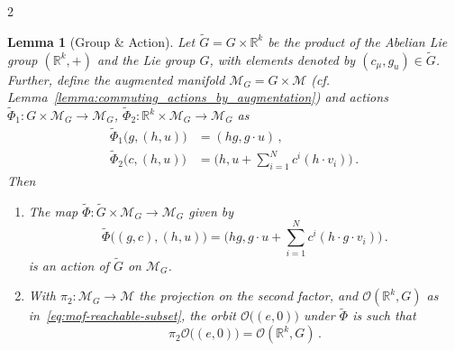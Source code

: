 \documentclass{article}
\newtheorem{lemma}[theorem]{Lemma}
\newcommand{\M}{\mathcal{M}}                                %
\newcommand{\R}{\mathbb{R}}                                 %
\begin{document}
\begin{multicols}{2}
\begin{lemma}[Group \& Action]\label{lemma:mof-group-and-action-MoRLie}
    Let $\widetilde{G} = G \times \R^k$ be the product of the Abelian Lie group $(\R^k,+)$ and the Lie group $G$, with elements denoted by $(c_\mu,g_u) \in \widetilde{G}$.
    Further, define the augmented manifold $\M_G = G\times\M$ (cf. Lemma~\ref{lemma:commuting_actions_by_augmentation}) and actions $\widetilde{\Phi}_1:G \times \M_G \rightarrow \M_G$, $\widetilde{\Phi}_2: \R^k \times \M_G \rightarrow \M_G$ as 
    \begin{align}
        \widetilde{\Phi}_1\big(g,(h,u)\big) &= (hg, g\cdot u) \,, \\
        \widetilde{\Phi}_2\big(c,(h,u)\big) &= \bigg(h, u + \sum_{i=1}^N c^i (h\cdot v_i)\bigg)\,.
    \end{align}  
    Then
    \begin{enumerate}
        \item The map $\widetilde{\Phi}: \widetilde{G} \times \M_G \rightarrow \M_G$ given by
                \begin{equation}\label{eq:mof-action-MORLie}
                    \widetilde{\Phi}\big( (g,c), (h,u)\big) = \bigg(hg, g\cdot u +\sum_{i=1}^N c^i (h\cdot g\cdot v_i)\bigg)\,.
                \end{equation}
                is an action of $\widetilde{G}$ on $\M_G$.
        \item With $\pi_2:\M_G\rightarrow\M$ the projection on the second factor, and $\mathcal{O}(\R^k,G)$ as in~\eqref{eq:mof-reachable-subset}, the orbit $\mathcal{O}\big((e,0)\big)$ under $\widetilde{\Phi}$ is such that
                \begin{equation}\label{eq:mof-orbit-equivalence}
                    \pi_2 \mathcal{O}\big((e,0)\big) = \mathcal{O}(\R^k,G) \,.%
                \end{equation}  
    \end{enumerate} 
     

\end{lemma}
\end{multicols}
\end{document}
